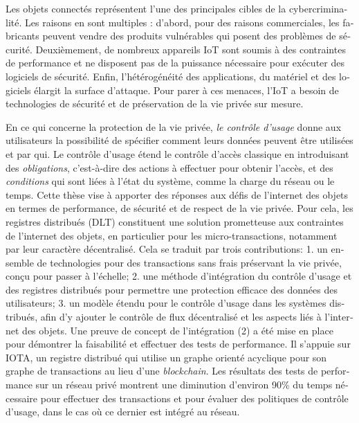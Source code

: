 \begin{otherlanguage}{french}
    
Les objets connectés représentent l'une des principales cibles de la cybercriminalité. Les raisons en sont multiples : d'abord, pour des raisons commerciales, les fabricants peuvent vendre des produits vulnérables qui posent des problèmes de sécurité. Deuxièmement, de nombreux appareils IoT sont soumis à des contraintes de performance et ne disposent pas de la puissance nécessaire pour exécuter des logiciels de sécurité. Enfin, l'hétérogénéité des applications, du matériel et des logiciels élargit la surface d'attaque.
Pour parer à ces menaces, l'IoT a besoin de technologies de sécurité et de préservation de la vie privée sur mesure.

 En ce qui concerne la protection de la vie privée, \emph{le contrôle d'usage} donne aux utilisateurs la possibilité de spécifier comment leurs données peuvent être utilisées et par qui. Le contrôle d'usage étend le contrôle d'accès classique en introduisant des \emph{obligations}, c'est-à-dire des actions à effectuer pour obtenir l'accès, et des \emph{conditions} qui sont liées à l'état du système, comme la charge du réseau ou le temps.
Cette thèse vise à apporter des réponses aux défis de l'internet des objets en termes de performance, de sécurité et de respect de la vie privée. Pour cela, les registres distribués (DLT) constituent une solution prometteuse aux contraintes de l'internet des objets, en particulier pour les micro-transactions, notamment par leur caractère décentralisé. Cela se traduit par trois contributions:
1. un ensemble de technologies pour des transactions sans frais préservant la vie privée, conçu pour passer à l'échelle;
2. une méthode d'intégration du contrôle d'usage et des registres distribués pour permettre une protection efficace des données des utilisateurs;
3. un modèle étendu pour le contrôle d'usage dans les systèmes distribués, afin d'y ajouter le contrôle de flux décentralisé et les aspects liés à l'internet des objets.
Une preuve de concept de l'intégration (2) a été mise en place pour démontrer la faisabilité et effectuer des tests de performance. Il s'appuie sur IOTA, un registre distribué qui utilise un graphe orienté acyclique pour son graphe de transactions au lieu d'une \emph{blockchain}. Les résultats des tests de performance sur un réseau privé montrent une diminution d'environ 90\% du temps nécessaire pour effectuer des transactions et pour évaluer des politiques de contrôle d'usage, dans le cas où ce dernier est intégré au réseau.

\end{otherlanguage}